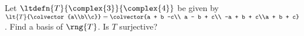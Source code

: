 Let $\ltdefn{T}{\complex{3}}{\complex{4}}$ be given by 
$\lt{T}{\colvector{a\\b\\c}} = \colvector{a + b -c\\ a - b + c\\ -a + b + c\\a + b + c}$.  
Find a basis of $\rng{T}$.  Is $T$ surjective?  
%